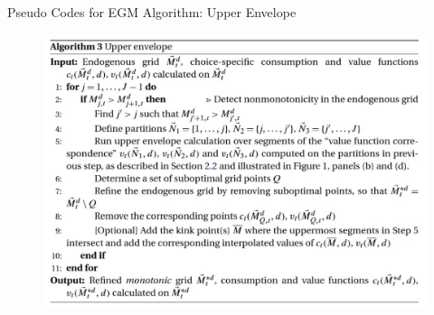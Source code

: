 \documentclass[aspectratio=169]{beamer}
\begin{document}
\begin{frame}{Pseudo Codes for EGM Algorithm: Upper Envelope}
	\begin{figure}
		\includegraphics[scale=0.55]{algorithm3.jpg}
	\end{figure}
\end{frame}
\end{document}
